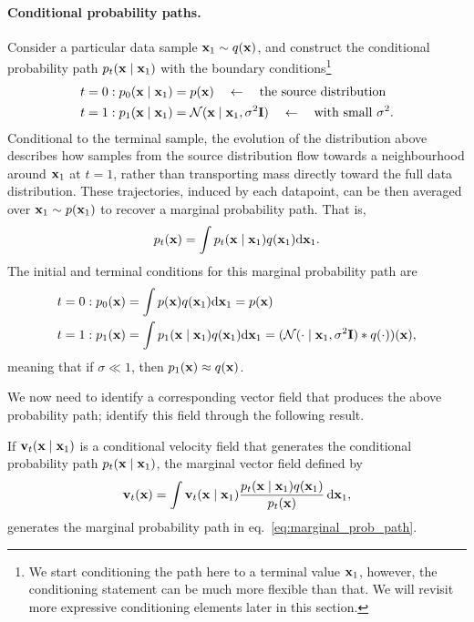 \paragraph{Conditional probability paths.} Consider a particular data sample ${ \mathbf{x}}_1\sim q({ \mathbf{x}})$, and construct the conditional probability  path $p_t({ \mathbf{x}} \mid { \mathbf{x}}_1) $ with the boundary conditions\footnote{We start conditioning the path here to a terminal value ${ \mathbf{x}}_1$, however, the conditioning statement can be much more flexible than that. We will revisit more expressive conditioning elements later in this section.}
\begin{align}
    t=0 : p_0({ \mathbf{x}} \mid { \mathbf{x}}_1) &= p({ \mathbf{x}})\quad \leftarrow \quad \text{the source distribution}\\
    t=1 : p_1({ \mathbf{x}} \mid { \mathbf{x}}_1) &= {\mathcal N}({ \mathbf{x}} \mid { \mathbf{x}}_1,\sigma^2{\mathbf I}) \quad \leftarrow \quad \text{with small } \sigma^2.
\end{align}
Conditional to the terminal sample, the evolution of the distribution above describes how samples from the source distribution flow towards a neighbourhood around ${ \mathbf{x}}_1$ at $t=1$, rather than transporting mass directly toward the full data distribution. These trajectories, induced by each datapoint, can be then averaged over ${ \mathbf{x}}_1 \sim p({ \mathbf{x}}_1)$ to recover a marginal probability path. That is, 
\begin{equation}
    \label{eq:marginal_prob_path}
    p_t({ \mathbf{x}}) = \int p_t({ \mathbf{x}} \mid { \mathbf{x}}_1) q({ \mathbf{x}}_1){\text{d}}{ \mathbf{x}}_1.
\end{equation}
The initial and terminal conditions for this marginal probability path are 
\begin{align}
    t=0 : p_0({ \mathbf{x}}) &=  \int p({ \mathbf{x}}) q({ \mathbf{x}}_1){\text{d}}{ \mathbf{x}}_1 = p({ \mathbf{x}})\\
    t=1 : p_1({ \mathbf{x}}) &=  \int p_1({ \mathbf{x}} \mid { \mathbf{x}}_1) q({ \mathbf{x}}_1){\text{d}}{ \mathbf{x}}_1 =  ({\mathcal N}(\cdot \mid { \mathbf{x}}_1,\sigma^2{\mathbf I}) \ast q(\cdot))({ \mathbf{x}}),
\end{align}
meaning that if $\sigma \ll 1$, then $p_1({ \mathbf{x}})\approx q({ \mathbf{x}})$.

We now need to identify a corresponding vector field that produces the above probability path; \cite{lipman2023flowmatching} identify this field through the  following result. 

\begin{theorem}
    \label{thm:lipman_VF}
    If ${ \mathbf{v}}_t({ \mathbf{x}} \mid { \mathbf{x}}_1) $ is a conditional velocity field that generates the conditional probability path $p_t({ \mathbf{x}} \mid { \mathbf{x}}_1)$, the marginal vector field defined by 
    \begin{equation}
        \label{eq:marginal_vactor_field}
        { \mathbf{v}}_t({ \mathbf{x}}) = \int { \mathbf{v}}_t({ \mathbf{x}} \mid { \mathbf{x}}_1) 
        \frac{p_t({ \mathbf{x}} \mid { \mathbf{x}}_1) q({ \mathbf{x}}_1)}{p_t({ \mathbf{x}})}\,{\text{d}}{ \mathbf{x}}_1, 
    \end{equation}
    generates the marginal probability path in 
    eq.~\eqref{eq:marginal_prob_path}.
\end{theorem}

